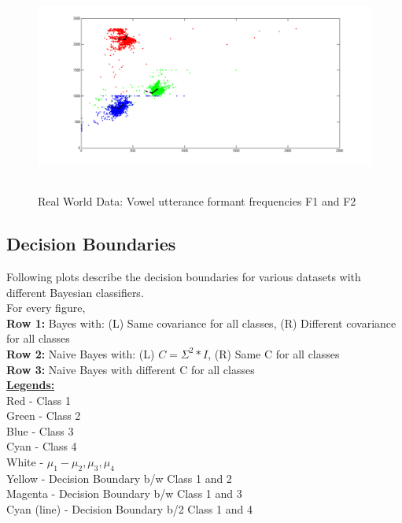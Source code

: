 \documentclass[11pt,a4paper]{article}
\begin{document}
\begin{figure}[H]
	\centering
\includegraphics[height=7cm]{Figures/RWD_eig.png}
\caption{Real World Data: Vowel utterance formant frequencies F1 and F2}
\end{figure}

\clearpage
\subsection{Decision Boundaries}
Following plots describe the decision boundaries for various datasets with different Bayesian classifiers. \\

For every figure,\\
\textbf{Row 1:} Bayes with: (L) Same covariance for all classes, (R) Different covariance for all classes\\
\textbf{Row 2:\textbf{}} Naive Bayes with: (L) $C = \Sigma^2*I$, (R) Same C for all classes\\
\textbf{Row 3:} Naive Bayes with different C for all classes\\

\underline{\textbf{Legends:}}\\
Red - Class 1\\
Green - Class 2\\
Blue - Class 3\\
Cyan - Class 4\\
White - $\mu_1 - \mu_2, \mu_3, \mu_4$\\
Yellow - Decision Boundary b/w Class 1 and 2 \\
Magenta - Decision Boundary b/w Class 1 and 3 \\
Cyan (line) - Decision Boundary b/2 Class 1 and 4 
\end{document}
